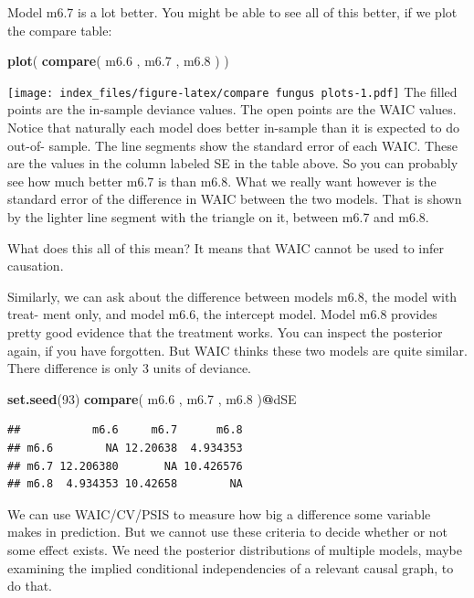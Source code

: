 \documentclass[
]{article}
\newenvironment{Shaded}{\begin{snugshade}}{\end{snugshade}}
\newcommand{\DecValTok}[1]{\textcolor[rgb]{0.00,0.00,0.81}{#1}}
\newcommand{\FloatTok}[1]{\textcolor[rgb]{0.00,0.00,0.81}{#1}}
\newcommand{\KeywordTok}[1]{\textcolor[rgb]{0.13,0.29,0.53}{\textbf{#1}}}
\newcommand{\NormalTok}[1]{#1}
\newcommand{\OperatorTok}[1]{\textcolor[rgb]{0.81,0.36,0.00}{\textbf{#1}}}
\begin{document}
Model m6.7 is a lot better. You might be able to see all of this better,
if we plot the compare table:

\begin{Shaded}
\begin{Highlighting}[]
 \KeywordTok{plot}\NormalTok{( }\KeywordTok{compare}\NormalTok{( m6}\FloatTok{.6}\NormalTok{ , m6}\FloatTok{.7}\NormalTok{ , m6}\FloatTok{.8}\NormalTok{ ) )}
\end{Highlighting}
\end{Shaded}

\texttt{[image: index\_files/figure-latex/compare fungus plots-1.pdf]}
The filled points are the in-sample deviance values. The open points are
the WAIC values. Notice that naturally each model does better in-sample
than it is expected to do out-of- sample. The line segments show the
standard error of each WAIC. These are the values in the column labeled
SE in the table above. So you can probably see how much better m6.7 is
than m6.8. What we really want however is the standard error of the
difference in WAIC between the two models. That is shown by the lighter
line segment with the triangle on it, between m6.7 and m6.8.

What does this all of this mean? It means that WAIC cannot be used to
infer causation.

Similarly, we can ask about the difference between models m6.8, the
model with treat- ment only, and model m6.6, the intercept model. Model
m6.8 provides pretty good evidence that the treatment works. You can
inspect the posterior again, if you have forgotten. But WAIC thinks
these two models are quite similar. There difference is only 3 units of
deviance.

\begin{Shaded}
\begin{Highlighting}[]
\KeywordTok{set.seed}\NormalTok{(}\DecValTok{93}\NormalTok{)}
\KeywordTok{compare}\NormalTok{( m6}\FloatTok{.6}\NormalTok{ , m6}\FloatTok{.7}\NormalTok{ , m6}\FloatTok{.8}\NormalTok{ )}\OperatorTok{@}\NormalTok{dSE}
\end{Highlighting}
\end{Shaded}

\begin{verbatim}
##           m6.6     m6.7      m6.8
## m6.6        NA 12.20638  4.934353
## m6.7 12.206380       NA 10.426576
## m6.8  4.934353 10.42658        NA
\end{verbatim}

We can use WAIC/CV/PSIS to measure how big a difference some variable
makes in prediction. But we cannot use these criteria to decide whether
or not some effect exists. We need the posterior distributions of
multiple models, maybe examining the implied conditional independencies
of a relevant causal graph, to do that.
\end{document}
